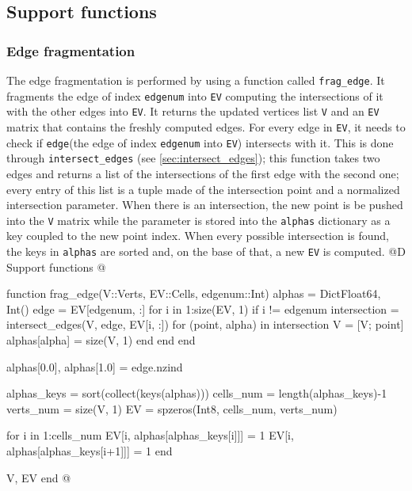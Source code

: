 \documentclass[10pt,oneside]{article}
\begin{document}
\subsection{Support functions}
\subsubsection{Edge fragmentation}
\label{sec:frag_edge}
The edge fragmentation is performed by using a function called \texttt{frag\_edge}.
It fragments the edge of index \texttt{edgenum} into \texttt{EV} computing the intersections of
it with the other edges into \texttt{EV}. It returns the updated vertices list \texttt{V} and an 
\texttt{EV} matrix that contains the freshly computed edges.
For every edge in \texttt{EV}, it needs to check if \texttt{edge}(the edge of index \texttt{edgenum} into 
\texttt{EV}) intersects with it. This is done through \texttt{intersect\_edges} (see \ref{sec:intersect_edges}); 
this function takes two edges and returns a list of the intersections of the first edge with the second one; 
every entry of this list is a tuple made of the intersection point and a normalized intersection parameter. 
When there is an intersection, the new point is be pushed into the \texttt{V} matrix while the parameter 
is stored into the \texttt{alphas} dictionary as a key coupled to the new point index.
When every possible intersection is found, the keys in \texttt{alphas} are sorted and, on the base of that,
a new \texttt{EV} is computed.
@D Support functions
@{function frag_edge(V::Verts, EV::Cells, edgenum::Int)
    alphas = Dict{Float64, Int}()
    edge = EV[edgenum, :]
    for i in 1:size(EV, 1)
        if i != edgenum
            intersection = intersect_edges(V, edge, EV[i, :])
            for (point, alpha) in intersection
                V = [V; point]
                alphas[alpha] = size(V, 1)
            end
        end
    end

    alphas[0.0], alphas[1.0] = edge.nzind

    alphas_keys = sort(collect(keys(alphas)))
    cells_num = length(alphas_keys)-1
    verts_num = size(V, 1)
    EV = spzeros(Int8, cells_num, verts_num)

    for i in 1:cells_num
        EV[i, alphas[alphas_keys[i]]] = 1
        EV[i, alphas[alphas_keys[i+1]]] = 1
    end

    V, EV
end
@}
\end{document}
